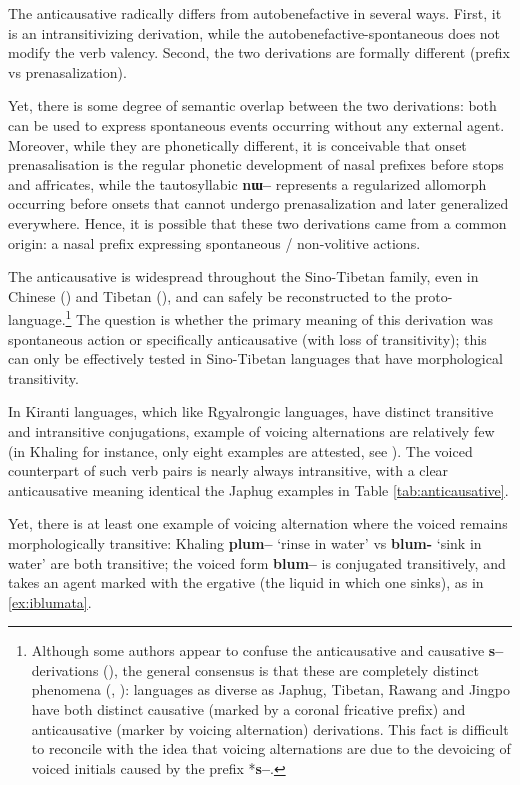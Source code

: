 \documentclass[oldfontcommands,oneside,a4paper,11pt]{article}
\newcommand{\ipa}[1]{\textbf{{\phon\mbox{#1}}}} %
\begin{document}
The anticausative radically differs from autobenefactive in several ways. First, it is an intransitivizing derivation, while the autobenefactive-spontaneous does not modify the verb valency. Second, the two derivations are formally different (prefix vs prenasalization). 

Yet, there is some degree of semantic overlap between the two derivations: both can be used to express spontaneous events occurring without any external agent. Moreover, while they are phonetically different, it is conceivable that onset prenasalisation is the regular phonetic development of nasal prefixes before stops and affricates, while the tautosyllabic \ipa{nɯ--} represents a regularized allomorph occurring before onsets that cannot undergo prenasalization and later generalized everywhere. Hence, it is possible that these two derivations came from a common origin: a nasal prefix expressing spontaneous / non-volitive actions. 

The anticausative is widespread throughout the Sino-Tibetan family, even in Chinese (\citealt{sagart12sprefix}) and Tibetan (\citealt{jacques12internal}), and can safely be reconstructed to the proto-language.\footnote{Although some authors appear to  confuse the anticausative and causative \ipa{s--} derivations (\citealt{mei12caus}), the general consensus is that these are completely distinct phenomena (\citealt{lapolla03}, \citealt{hill14voicing}): languages as diverse as  Japhug, Tibetan, Rawang and Jingpo have both distinct causative (marked by a coronal fricative prefix) and anticausative (marker by voicing alternation) derivations. This fact is difficult to reconcile with the idea that voicing alternations are due to the devoicing of voiced initials caused by the prefix *\ipa{s--}.} The question is whether the primary meaning of this derivation was spontaneous action or specifically anticausative (with loss of transitivity); this can only be effectively tested in Sino-Tibetan languages that have  morphological transitivity.

In Kiranti languages, which like Rgyalrongic languages, have distinct transitive and intransitive conjugations, example of voicing alternations are relatively few (in Khaling for instance, only eight examples are attested, see \citealt{jacques13derivational.khaling}). The voiced counterpart of such verb pairs is nearly always intransitive, with a clear anticausative meaning identical the Japhug examples in Table \ref{tab:anticausative}.


Yet, there is at least one example of voicing alternation where the voiced remains morphologically transitive: Khaling \ipa{plum--} `rinse in water' vs \ipa{blum-} `sink in water' are both transitive; the voiced form \ipa{blum--} is conjugated transitively, and takes an agent marked with the ergative (the liquid in which one sinks), as in \ref{ex:iblumata}.
\end{document}
